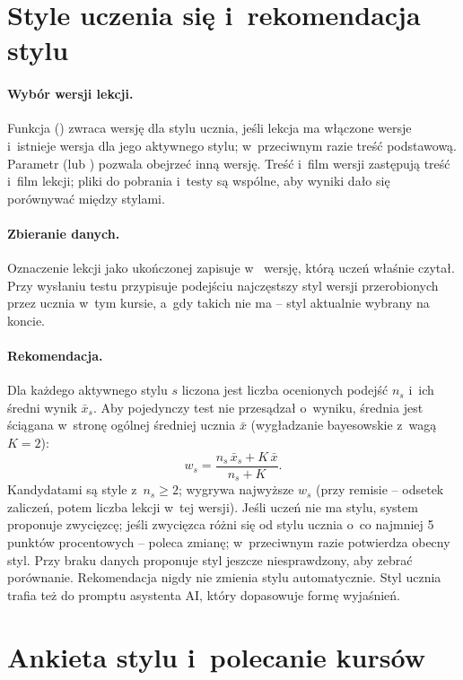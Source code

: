\section{Style uczenia się i~rekomendacja stylu}\label{sec:styles-algo}

\paragraph{Wybór wersji lekcji.} Funkcja  ()
zwraca wersję dla stylu ucznia, jeśli lekcja ma włączone wersje i~istnieje wersja dla jego
aktywnego stylu; w~przeciwnym razie treść podstawową. Parametr  (lub
) pozwala obejrzeć inną wersję. Treść i~film wersji zastępują treść i~film
lekcji; pliki do pobrania i~testy są wspólne, aby wyniki dało się porównywać między stylami.

\paragraph{Zbieranie danych.} Oznaczenie lekcji jako ukończonej zapisuje w~
wersję, którą uczeń właśnie czytał. Przy wysłaniu testu  przypisuje
podejściu najczęstszy styl wersji przerobionych przez ucznia w~tym kursie, a~gdy takich nie ma --
styl aktualnie wybrany na koncie.

\paragraph{Rekomendacja.} Dla każdego aktywnego stylu $s$ liczona jest liczba ocenionych podejść
$n_s$ i~ich średni wynik $\bar{x}_s$. Aby pojedynczy test nie przesądzał o~wyniku, średnia jest
ściągana w~stronę ogólnej średniej ucznia $\bar{x}$ (wygładzanie bayesowskie z~wagą $K=2$):
\[
w_s = \frac{n_s\,\bar{x}_s + K\,\bar{x}}{n_s + K}.
\]
Kandydatami są style z~$n_s \ge 2$; wygrywa najwyższe $w_s$ (przy remisie -- odsetek zaliczeń,
potem liczba lekcji w~tej wersji). Jeśli uczeń nie ma stylu, system proponuje zwycięzcę; jeśli
zwycięzca różni się od stylu ucznia o~co najmniej 5 punktów procentowych -- poleca zmianę;
w~przeciwnym razie potwierdza obecny styl. Przy braku danych proponuje styl jeszcze
niesprawdzony, aby zebrać porównanie. Rekomendacja nigdy nie zmienia stylu automatycznie.
Styl ucznia trafia też do promptu asystenta AI, który dopasowuje formę wyjaśnień.

\section{Ankieta stylu i~polecanie kursów}\label{sec:recommend}

